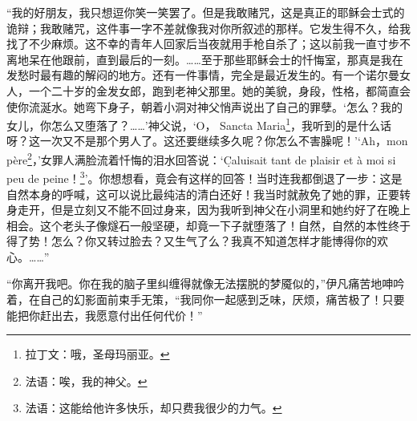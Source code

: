 \par “我的好朋友，我只想逗你笑一笑罢了。但是我敢赌咒，这是真正的耶稣会士式的诡辩；我敢赌咒，这件事一字不差就像我对你所叙述的那样。它发生得不久，给我找了不少麻烦。这不幸的青年人回家后当夜就用手枪自杀了；这以前我一直寸步不离地呆在他跟前，直到最后的一刻。……至于那些耶稣会士的忏悔室，那真是我在发愁时最有趣的解闷的地方。还有一件事情，完全是最近发生的。有一个诺尔曼女人，一个二十岁的金发女郎，跑到老神父那里。她的美貌，身段，性格，都简直会使你流涎水。她弯下身子，朝着小洞对神父悄声说出了自己的罪孽。‘怎么？我的女儿，你怎么又堕落了？……’神父说，‘O， Sancta Maria\footnote{拉丁文：哦，圣母玛丽亚。}，我听到的是什么话呀？这一次又不是那个男人了。这还要继续多久呢？你怎么不害臊呢！’‘Ah，mon père\footnote{法语：唉，我的神父。}，’女罪人满脸流着忏悔的泪水回答说：‘\d Caluisait tant de plaisir et à moi si peu de peine！\footnote{法语：这能给他许多快乐，却只费我很少的力气。}’。你想想看，竟会有这样的回答！当时连我都倒退了一步：这是自然本身的呼喊，这可以说比最纯洁的清白还好！我当时就赦免了她的罪，正要转身走开，但是立刻又不能不回过身来，因为我听到神父在小洞里和她约好了在晚上相会。这个老头子像燧石一般坚硬，却竟一下子就堕落了！自然，自然的本性终于得了势！怎么？你又转过脸去？又生气了么？我真不知道怎样才能博得你的欢心。……”
\par “你离开我吧。你在我的脑子里纠缠得就像无法摆脱的梦魇似的，”伊凡痛苦地呻吟着，在自己的幻影面前束手无策，“我同你一起感到乏味，厌烦，痛苦极了！只要能把你赶出去，我愿意付出任何代价！”
